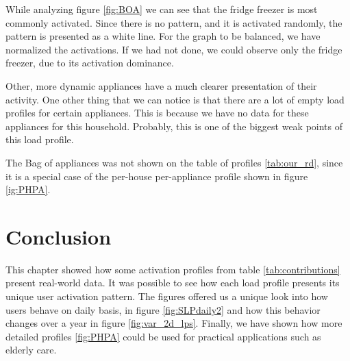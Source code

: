 While analyzing figure \ref{fig:BOA} we can see that the fridge freezer is most commonly activated.
Since there is no pattern, and it is activated randomly, the pattern is presented as a white line.
For the graph to be balanced, we have normalized the activations.
If we had not done, we could observe only the fridge freezer, due to its activation dominance. 

Other, more dynamic appliances have a much clearer presentation of their activity. 
One other thing that we can notice is that there are a lot of empty load profiles for certain appliances.
This is because we have no data for these appliances for this household.
Probably, this is one of the biggest weak points of this load profile.

The Bag of appliances was not shown on the table of profiles \ref{tab:our_rd},
since it is a special case of the per-house per-appliance profile shown in figure \ref{ig:PHPA}.

\section{Conclusion}

This chapter showed how some activation profiles from table \ref{tab:contributions} present real-world data.
It was possible to see how each load profile presents its unique user activation pattern. 
The figures offered us a unique look into how users behave on daily basis, in figure \ref{fig:SLPdaily2} and how this behavior changes over a year in figure \ref{fig:var_2d_lps}.
Finally, we have shown how more detailed profiles \ref{fig:PHPA} could be used for practical applications such as elderly care. 